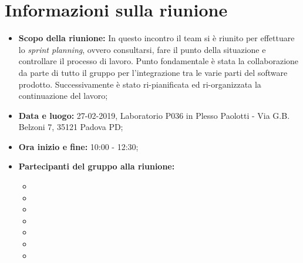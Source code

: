 \clearpage
\section{Informazioni sulla riunione}
\begin{itemize}
	\item \textbf {Scopo della riunione:} In questo incontro il team si è riunito per effettuare lo \textit{sprint planning}, ovvero consultarsi, fare il punto della situazione e controllare il processo di lavoro. Punto fondamentale è stata la collaborazione da parte di tutto il gruppo per l'integrazione tra le varie parti del software prodotto. Successivamente è stato ri-pianificata ed ri-organizzata la continuazione del lavoro;
	\item \textbf {Data e luogo:} 27-02-2019, Laboratorio P036 in Plesso Paolotti - Via G.B. Belzoni 7, 35121 Padova PD;
	\item \textbf {Ora inizio e fine:} 10:00 - 12:30;
	\item \textbf {Partecipanti del gruppo alla riunione:} 
		 \begin{itemize}
			\item \sonia
			\item \pardeep
			\item \luca
			\item \matteo
			\item \alberto
			\item \alessandro
			\item \andrea
		\end{itemize}
\end{itemize}